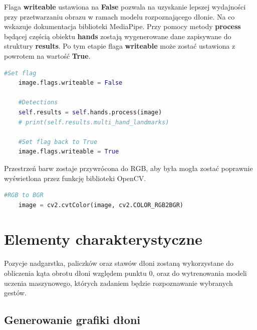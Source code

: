\quad Flaga \textbf{writeable} ustawiona na \textbf{False} pozwala na uzyskanie lepszej wydajności przy przetwarzaniu obrazu w ramach modelu rozpoznającego dłonie. Na co wskazuje dokumentacja biblioteki MediaPipe. Przy pomocy metody \textbf{process} będącej częścią obiektu \textbf{hands} zostają wygenerowane dane zapisywane do struktury \textbf{results}. Po tym etapie flaga \textbf{writeable} może zostać ustawiona z powrotem na wartość \textbf{True}. \newline 

\begin{lstlisting}[language=python, style=programming, captionpos=b, caption={Drugie przekształcenie}]
    #Set flag
    image.flags.writeable = False

    #Detections
    self.results = self.hands.process(image)
    # print(self.results.multi_hand_landmarks)

    #Set flag back to True
    image.flags.writeable = True
\end{lstlisting}

\quad Przestrzeń barw zostaje przywrócona do RGB, aby była mogła zostać poprawnie wyświetlona przez funkcję biblioteki OpenCV. \newline

\begin{lstlisting}[language=python, style=programming, captionpos=b, caption={Powrót do przestrzeni BGR}]
    #RGB to BGR
    image = cv2.cvtColor(image, cv2.COLOR_RGB2BGR)
\end{lstlisting}

\newpage

\section{Elementy charakterystyczne}

\quad Pozycje nadgarstka, paliczków oraz stawów dłoni zostaną wykorzystane do obliczenia kąta obrotu dłoni względem punktu 0, oraz do wytrenowania modeli uczenia maszynowego, których zadaniem będzie rozpoznawanie wybranych gestów. 

\subsection{Generowanie grafiki dłoni}

